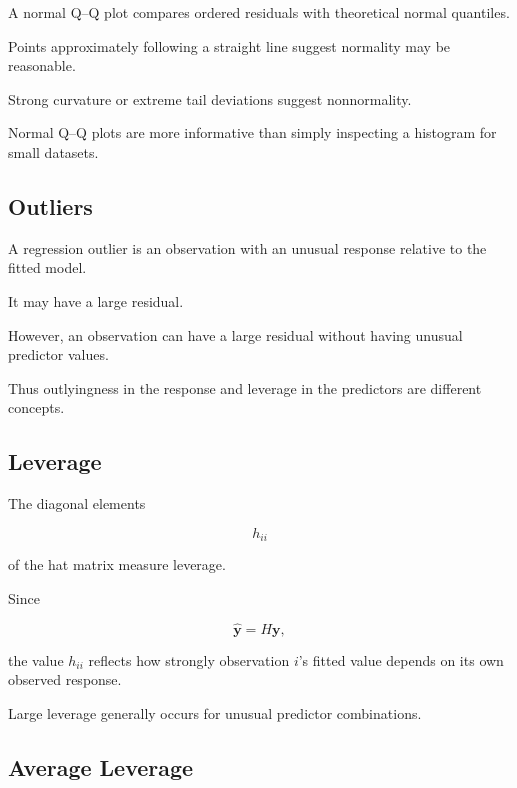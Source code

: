 A normal Q--Q plot compares ordered residuals with theoretical normal
quantiles.

Points approximately following a straight line suggest normality may be
reasonable.

Strong curvature or extreme tail deviations suggest nonnormality.

Normal Q--Q plots are more informative than simply inspecting a
histogram for small datasets.

\subsection{Outliers}
\label{subsec:regression-outliers}

A regression outlier is an observation with an unusual response relative
to the fitted model.

It may have a large residual.

However, an observation can have a large residual without having unusual
predictor values.

Thus outlyingness in the response and leverage in the predictors are
different concepts.

\subsection{Leverage}
\label{subsec:regression-leverage}

The diagonal elements

\[
h_{ii}
\]

of the hat matrix measure leverage.

Since

\[
\widehat{\mathbf{y}}
=
H\mathbf{y},
\]

the value \(h_{ii}\) reflects how strongly observation \(i\)'s fitted
value depends on its own observed response.

Large leverage generally occurs for unusual predictor combinations.

\subsection{Average Leverage}
\label{subsec:average-leverage}

